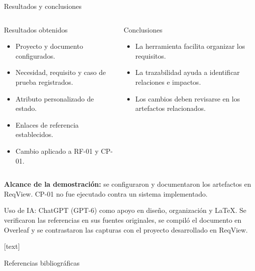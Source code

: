 \documentclass[aspectratio=169,11pt]{beamer}
\begin{document}
\begin{frame}[t]{Resultados y conclusiones}
	\small
	
	\begin{columns}[T,onlytextwidth]
		\begin{block}{Resultados obtenidos}
			\begin{itemize}
				\item Proyecto y documento configurados.
				\item Necesidad, requisito y caso de prueba registrados.
				\item Atributo personalizado de estado.
				\item Enlaces de referencia establecidos.
				\item Cambio aplicado a RF-01 y CP-01.
			\end{itemize}
		\end{block}
		
		\begin{block}{Conclusiones}
			\begin{itemize}
				\item La herramienta facilita organizar los requisitos.
				\item La trazabilidad ayuda a identificar relaciones e impactos.
				\item Los cambios deben revisarse en los artefactos relacionados.
			\end{itemize}
		\end{block}
	\end{columns}
	
	\vspace{0.15cm}
	
	\textbf{Alcance de la demostración:} se configuraron y documentaron los artefactos en ReqView. CP-01 no fue ejecutado contra un sistema implementado.
	
	\vfill
	
	{\fontsize{7}{9}\selectfont\color{rvmuted}
Uso de IA: ChatGPT (GPT-6) como apoyo en diseño, organización y LaTeX. Se verificaron las referencias en sus fuentes originales, se compiló el documento en Overleaf y se contrastaron las capturas con el proyecto desarrollado en ReqView.}
	
\end{frame}

[text]

\begin{frame}[t]{Referencias bibliográficas}
\fontsize{7}{8.8}\selectfont


\end{frame}
\end{document}
